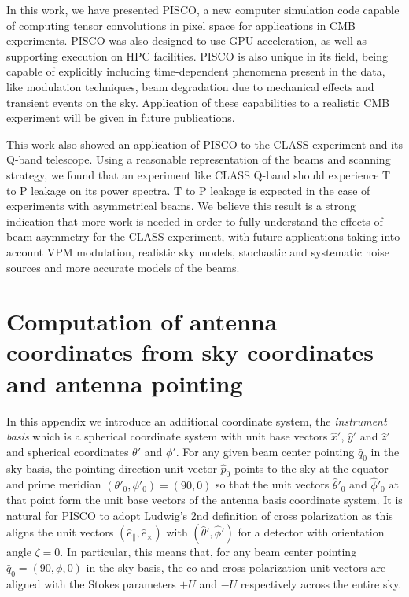 \documentclass[a4paper,fleqn]{cas-dc}\sloppy
\newcommand{\co}{\mathbin{\|}}
\newcommand{\cx}{\mathbin{\times}}
\begin{document}
	In this work, we have presented PISCO, a new computer simulation code capable of computing tensor convolutions in pixel space for applications in CMB experiments. PISCO was also designed to use GPU acceleration, as well as supporting execution on HPC facilities. PISCO is also unique in its field, being capable of explicitly including time-dependent phenomena present in the data, like modulation techniques, beam degradation due to mechanical effects and transient events on the sky. Application of these capabilities to a realistic CMB experiment will be given in future publications.
	
	This work also showed an application of PISCO to the CLASS experiment and its Q-band telescope. Using a reasonable representation of the beams and scanning strategy, we found that an experiment like CLASS Q-band should experience T to P leakage on its power spectra. T to P leakage is expected in the case of experiments with asymmetrical beams. We believe this result is a strong indication that more work is needed in order to fully understand the effects of beam asymmetry for the CLASS experiment, with future applications taking into account VPM modulation, realistic sky models, stochastic and systematic noise sources and more accurate models of the beams.
	
	
	
	

	\appendix
	\section{Computation of antenna coordinates from sky coordinates and antenna pointing}
	
	In this appendix we introduce an additional coordinate system, the \textsl{instrument basis} which is a spherical coordinate system with unit base vectors $\hat{x}'$, $\hat{y}'$ and $\hat{z}'$ and spherical coordinates $\theta'$ and $\phi'$. For any given beam center pointing $\bar{q}_0$ in the sky basis, the pointing direction unit vector $\hat{p}_0$ points to the sky at the equator and prime meridian $(\theta'_0,\phi'_0) = (90,0)$ so that the unit vectors $\hat{\theta}'_0$ and $\hat{\phi}'_0$ at that point form the unit base vectors of the antenna basis coordinate system. It is natural for PISCO to adopt Ludwig's 2nd definition of cross polarization \cite{1140406} as this aligns the unit vectors $(\hat{e}_{\co},\hat{e}_{\cx})$ with $(\hat{\theta}',\hat{\phi}')$ for a detector with orientation angle $\zeta = 0$. In particular, this means that, for any beam center pointing $\bar{q}_0 = (90,\phi,0)$ in the sky basis, the co and cross polarization unit vectors are aligned with the Stokes parameters $+U$ and $-U$ respectively across the entire sky.
	
\end{document}
